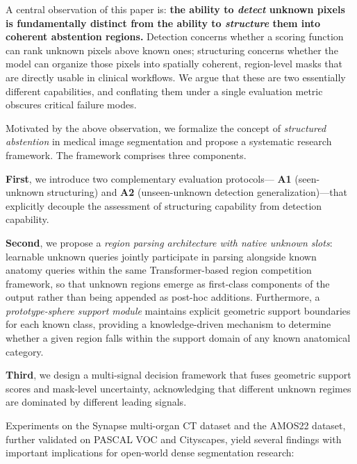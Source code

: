 \documentclass[3p,twocolumn,authoryear]{elsarticle}
\begin{document}

A central observation of this paper is:
\textbf{the ability to \emph{detect} unknown pixels is fundamentally distinct from
the ability to \emph{structure} them into coherent abstention regions.}
Detection concerns whether a scoring function can rank unknown pixels above known ones;
structuring concerns whether the model can organize those pixels into spatially coherent,
region-level masks that are directly usable in clinical workflows.
We argue that these are two essentially different capabilities, and conflating them
under a single evaluation metric obscures critical failure modes.

Motivated by the above observation, we formalize the concept of \emph{structured abstention}
in medical image segmentation and propose a systematic research framework.
The framework comprises three components.

\textbf{First}, we introduce two complementary evaluation protocols---
\textbf{A1} (seen-unknown structuring) and
\textbf{A2} (unseen-unknown detection generalization)---that
explicitly decouple the assessment of structuring capability from detection capability.

\textbf{Second}, we propose a \emph{region parsing architecture with native unknown slots}:
learnable unknown queries jointly participate in parsing alongside known anatomy queries
within the same Transformer-based region competition framework,
so that unknown regions emerge as first-class components of the output rather than
being appended as post-hoc additions.
Furthermore, a \emph{prototype-sphere support module} maintains explicit geometric support
boundaries for each known class, providing a knowledge-driven mechanism to determine
whether a given region falls within the support domain of any known anatomical category.

\textbf{Third}, we design a multi-signal decision framework that fuses geometric support
scores and mask-level uncertainty, acknowledging that different unknown regimes are
dominated by different leading signals.


Experiments on the Synapse multi-organ CT dataset and the AMOS22 dataset, further
validated on PASCAL VOC and Cityscapes, yield several findings with important
implications for open-world dense segmentation research:
\end{document}
